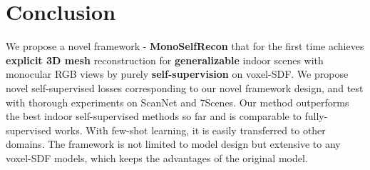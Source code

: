 \section{Conclusion}
\vspace{-2mm}
\quad We propose a novel framework - \textbf{MonoSelfRecon} that for the first time achieves \textbf{explicit 3D mesh} reconstruction for \textbf{generalizable} indoor scenes with monocular RGB views by purely \textbf{self-supervision} on voxel-SDF. We propose novel self-supervised losses corresponding to our novel framework design, and test with thorough experiments on ScanNet and 7Scenes. Our method outperforms the best indoor self-supervised methods so far and is comparable to fully-supervised works. With few-shot learning, it is easily transferred to other domains. The framework is not limited to model design but extensive to any voxel-SDF models, which keeps the advantages of the original model. 


